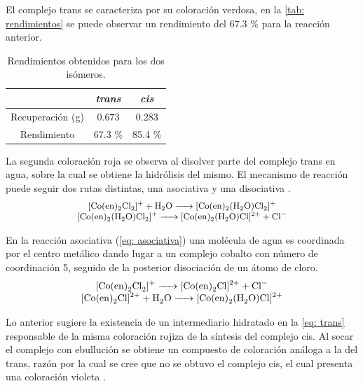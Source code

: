 \documentclass[fleqn,10pt]{SelfArx} %
\begin{document}
	El complejo trans se caracteriza por su coloraci\'on verdosa, en la \autoref{tab: rendimientos} se puede observar un rendimiento del 67.3 \% para la reacci\'on anterior. 
	\begin{table}[h]
	    \centering
	    \caption{Rendimientos obtenidos para los dos is\'omeros.}
	    \begin{tabular}{c|cc}
	        \hline
	        & \textit{trans} & \textit{cis} \\
	        \hline
	        Recuperaci\'on (g) & 0.673 & 0.283 \\
	        Rendimiento & 67.3 \% & 85.4 \% \\
	        \hline
	    \end{tabular}
	    \label{tab: rendimientos}
	\end{table} 
	
	La segunda coloraci\'on roja se observa al disolver parte del complejo trans en agua, sobre la cual se obtiene la hidr\'olisis del mismo. El mecanismo de reacci\'on puede seguir dos rutas distintas, una asociativa y una disociativa \cite{Afzal}.
	\begin{equation}\label{eq: asociativa}
	    \small
	    \begin{array}{c}
	        \ce{[Co(en)_2Cl_2]+ + H_2O -> [Co(en)_2(H_2O)Cl_2]+} \\
	        \ce{[Co(en)_2(H_2O)Cl_2]+ -> [Co(en)_2(H_2O)Cl]^{2+} + Cl-}
	    \end{array}
	    \normalsize
	\end{equation}
	
	En la reacci\'on asociativa (\autoref{eq: asociativa}) una mol\'ecula de agua es coordinada por el centro met\'alico dando lugar a un complejo cobalto con n\'umero de coordinaci\'on 5, seguido de la posterior disociaci\'on de un \'atomo de cloro.
	\begin{equation}\label{eq: disociativa}
	    \begin{array}{c}
	        \ce{[Co(en)_2Cl_2]+ -> [Co(en)2Cl]^{2+} + Cl-} \\
	        \ce{[Co(en)_2Cl]^{2+} + H2O -> [Co(en)2(H2O)Cl]^{2+}}
	    \end{array}
	\end{equation}
	
	Lo anterior sugiere la existencia de un intermediario hidratado en la \autoref{eq: trans} responsable de la misma coloraci\'on rojiza de la s\'intesis del complejo cis. Al secar el complejo con ebulluci\'on se obtiene un compuesto de coloraci\'on an\'aloga a la del trans, raz\'on por la cual se cree que no se obtuvo el complejo cis, el cual presenta una coloraci\'on violeta \cite{Color}. 
	
\end{document}
